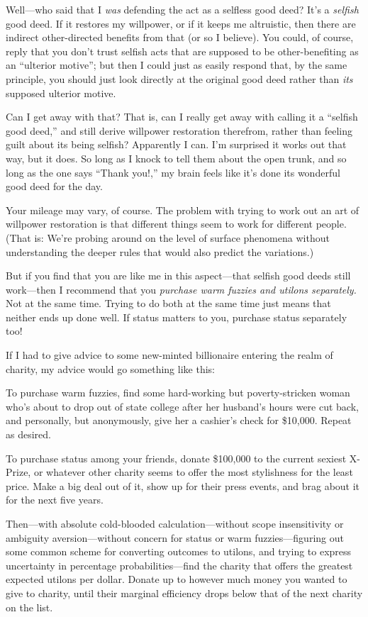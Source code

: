 {
 Well---who said that I \textit{was} defending the act as a
selfless good deed? It's a \textit{selfish} good deed.
If it restores my willpower, or if it keeps me altruistic, then there
are indirect other-directed benefits from that (or so I believe). You
could, of course, reply that you don't trust selfish
acts that are supposed to be other-benefiting as an
``ulterior motive''; but then I
could just as easily respond that, by the same principle, you should
just look directly at the original good deed rather than \textit{its}
supposed ulterior motive.}

{
 Can I get away with that? That is, can I really get away with
calling it a ``selfish good deed,''
and still derive willpower restoration therefrom, rather than feeling
guilt about its being selfish? Apparently I can. I'm
surprised it works out that way, but it does. So long as I knock to
tell them about the open trunk, and so long as the one says
``Thank you!,'' my brain feels like
it's done its wonderful good deed for the day.}

{
 Your mileage may vary, of course. The problem with trying to work
out an art of willpower restoration is that different things seem to
work for different people. (That is: We're probing
around on the level of surface phenomena without understanding the
deeper rules that would also predict the variations.)}

{
 But if you find that you are like me in this aspect---that selfish
good deeds still work---then I recommend that you \textit{purchase warm
fuzzies and utilons separately.} Not at the same time. Trying to do
both at the same time just means that neither ends up done well. If
status matters to you, purchase status separately too!}

{
 If I had to give advice to some new-minted billionaire entering
the realm of charity, my advice would go something like this:}

{
 To purchase warm fuzzies, find some hard-working but
poverty-stricken woman who's about to drop out of state
college after her husband's hours were cut back, and
personally, but anonymously, give her a cashier's check
for \$10,000. Repeat as desired.}

{
 To purchase status among your friends, donate \$100,000 to the
current sexiest X-Prize, or whatever other charity seems to offer the
most stylishness for the least price. Make a big deal out of it, show
up for their press events, and brag about it for the next five years.}

{
 Then---with absolute cold-blooded calculation---without scope
insensitivity or ambiguity aversion{}---without concern for status or
warm fuzzies---figuring out some common scheme for converting outcomes
to utilons, and trying to express uncertainty in percentage
probabilities---find the charity that offers the greatest expected
utilons per dollar. Donate up to however much money you wanted to give
to charity, until their marginal efficiency drops below that of the
next charity on the list.}


